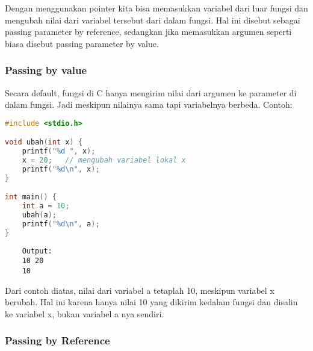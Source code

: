 Dengan menggunakan pointer kita bisa memasukkan variabel dari luar fungsi dan mengubah nilai dari variabel tersebut dari dalam fungsi.
Hal ini disebut sebagai passing parameter by reference, sedangkan jika memasukkan argumen seperti biasa disebut passing parameter by value.

\subsubsection{Passing by value}

Secara default, fungsi di C hanya mengirim nilai dari argumen ke parameter di dalam fungsi.
Jadi meskipun nilainya sama tapi variabelnya berbeda.
Contoh:

\begin{lstlisting}[language=c]
#include <stdio.h>

void ubah(int x) {
	printf("%d ", x);
	x = 20;   // mengubah variabel lokal x
	printf("%d\n", x);
}

int main() {
	int a = 10;
	ubah(a);
	printf("%d\n", a);
}
\end{lstlisting}
\begin{verbatim}
	Output:
	10 20
	10
\end{verbatim}
Dari contoh diatas, nilai dari variabel a tetaplah 10, meskipun variabel x berubah.
Hal ini karena hanya nilai 10 yang dikirim kedalam fungsi dan disalin ke variabel x, bukan variabel a nya sendiri.

\subsubsection{Passing by Reference}

